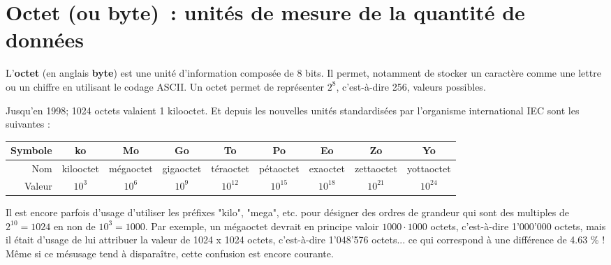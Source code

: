 \section{Octet (ou byte) : unités de mesure de la quantité de données}
\begin{myrappel}
	L'{\bf octet} (en anglais {\bf byte}) est une unité d'information composée de 8 bits. Il permet, notamment de stocker un caractère comme une lettre ou un chiffre en utilisant le codage ASCII. Un octet permet de représenter $2^8$, c'est-à-dire 256, valeurs possibles.
\end{myrappel}
Jusqu'en 1998; 1024 octets valaient 1 kilooctet. Et depuis les nouvelles unités standardisées par l'organisme international IEC sont les suivantes :
\begin{center}
	\begin{tabular}{| r || c |  c | c | c | c | c | c |  c |}
		\hline
		Symbole & ko & Mo & Go & To & Po & Eo & Zo & Yo \\ \hline
		Nom & kilooctet & mégaoctet & gigaoctet & téraoctet & pétaoctet & exaoctet & zettaoctet & yottaoctet   \\ \hline
		Valeur & $10^{3}$ & $10^{6}$ & $10^{9}$ & $10^{12}$ & $10^{15}$ & $10^{18}$ & $10^{21}$ & $10^{24}$  \\ \hline
	\end{tabular}
\end{center}

\begin{myremarque}
	Il est encore parfois d'usage d'utiliser les préfixes "kilo", "mega", etc. pour désigner des ordres de grandeur qui sont des multiples de $2^{10}=1024$ en non de $10^3=1000$. Par exemple, un mégaoctet devrait en principe valoir $1000 \cdot 1000$ octets, c'est-à-dire 1'000'000 octets, mais il était d'usage de lui attribuer la valeur de  1024 x 1024 octets, c'est-à-dire 1'048'576 octets... ce qui correspond à une différence de 4.63 \% ! Même si ce mésusage tend à disparaître, cette confusion est encore courante.
\end{myremarque}

